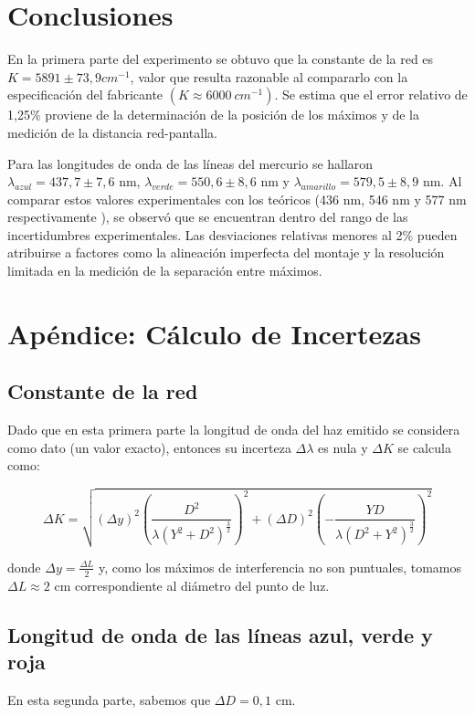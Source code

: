 \documentclass[12pt, a4paper]{article}
\begin{document}
\section{Conclusiones}

En la primera parte del experimento se obtuvo que la constante de la red es  $K = 5891 \pm 73,9 cm^{-1}$, valor que resulta razonable al 
compararlo con la especificación del fabricante $(K\approx6000\ cm^{-1})$. Se estima que el error relativo de 1,25\% proviene de la 
determinación de la posición de los máximos y de la medición de la distancia red-pantalla.

Para las longitudes de onda de las líneas del mercurio se hallaron $\lambda_{azul} = 437,7 \pm 7,6$ nm, 
$\lambda_{verde} = 550,6 \pm 8,6$ nm y $\lambda_{amarillo} = 579,5 \pm 8,9$ nm. Al comparar estos valores experimentales con los teóricos 
(436 nm, 546 nm y 577 nm respectivamente \cite{uiowa_mercury}), se observó que se encuentran dentro del rango de las incertidumbres 
experimentales. Las desviaciones relativas menores al 2\% pueden atribuirse a factores como la alineación imperfecta del montaje y la 
resolución limitada en la medición de la separación entre máximos.


\section{Apéndice: Cálculo de Incertezas}

\subsection{Constante de la red}
Dado que en esta primera parte la longitud de onda del haz emitido se considera como dato (un valor exacto), entonces su incerteza 
$\Delta \lambda$ es nula y ${\Delta}K$ se calcula como:

\begin{equation}
  {\Delta}K = \sqrt{({\Delta}y)^2(\frac{D^{2}}{{\lambda} \left(Y^{2} + D^{2}\right)^{\frac{3}{2}}})^2+({\Delta}D)^2(-\frac{YD}
  {{\lambda} \left(D^{2} + Y^{2}\right)^{\frac{3}{2}}})^2}
\label{equation3}
\end{equation}

donde $\Delta y = \frac{\Delta L}{2}$ y, como los máximos de interferencia no son puntuales, tomamos $\Delta L \approx 2$ cm correspondiente
al diámetro del punto de luz.

\subsection{Longitud de onda de las líneas azul, verde y roja}
En esta segunda parte, sabemos que $\Delta D = 0,1$ cm.
\end{document}
